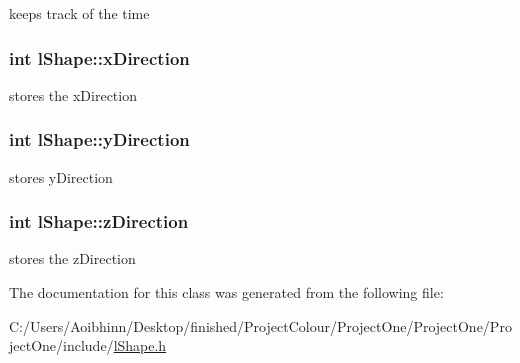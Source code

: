 keeps track of the time \hypertarget{classl_shape_a62f7483b65ac40883ec0f964869dc8c9}{
\subsubsection[{x\-Direction}]{\setlength{\rightskip}{0pt plus 5cm}int l\-Shape\-::x\-Direction}}\label{classl_shape_a62f7483b65ac40883ec0f964869dc8c9}
stores the x\-Direction \hypertarget{classl_shape_aefae6d46cb0caeff1eb58f91e7b8f092}{
\subsubsection[{y\-Direction}]{\setlength{\rightskip}{0pt plus 5cm}int l\-Shape\-::y\-Direction}}\label{classl_shape_aefae6d46cb0caeff1eb58f91e7b8f092}
stores y\-Direction \hypertarget{classl_shape_a3eccc5e34adeca221972a4cb19e65b57}{
\subsubsection[{z\-Direction}]{\setlength{\rightskip}{0pt plus 5cm}int l\-Shape\-::z\-Direction}}\label{classl_shape_a3eccc5e34adeca221972a4cb19e65b57}
stores the z\-Direction 

The documentation for this class was generated from the following file\-:\begin{DoxyCompactItemize}
\item 
C\-:/\-Users/\-Aoibhinn/\-Desktop/finished/\-Project\-Colour/\-Project\-One/\-Project\-One/\-Project\-One/include/\hyperlink{l_shape_8h}{l\-Shape.\-h}\end{DoxyCompactItemize}
